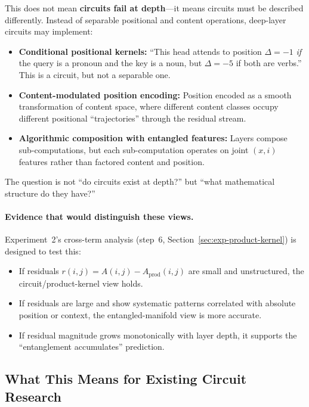 \documentclass[11pt]{article}
\theoremstyle{definition}
\begin{document}
This does not mean \textbf{circuits fail at depth}---it means circuits must be described differently. Instead of separable positional and content operations, deep-layer circuits may implement:
\begin{itemize}
    \item \textbf{Conditional positional kernels:} ``This head attends to position $\Delta = -1$ \emph{if} the query is a pronoun and the key is a noun, but $\Delta = -5$ if both are verbs.'' This is a circuit, but not a separable one.
    \item \textbf{Content-modulated position encoding:} Position encoded as a smooth transformation of content space, where different content classes occupy different positional ``trajectories'' through the residual stream.
    \item \textbf{Algorithmic composition with entangled features:} Layers compose sub-computations, but each sub-computation operates on joint $(x,i)$ features rather than factored content and position.
\end{itemize}

The question is not ``do circuits exist at depth?'' but ``what mathematical structure do they have?''

\paragraph{Evidence that would distinguish these views.}
Experiment~2's cross-term analysis (step~6, Section~\ref{sec:exp-product-kernel}) is designed to test this:
\begin{itemize}
    \item If residuals $r(i,j) = A(i,j) - A_{\text{prod}}(i,j)$ are small and unstructured, the circuit/product-kernel view holds.
    \item If residuals are large and show systematic patterns correlated with absolute position or context, the entangled-manifold view is more accurate.
    \item If residual magnitude grows monotonically with layer depth, it supports the ``entanglement accumulates'' prediction.
\end{itemize}

\subsection{What This Means for Existing Circuit Research}
\end{document}
